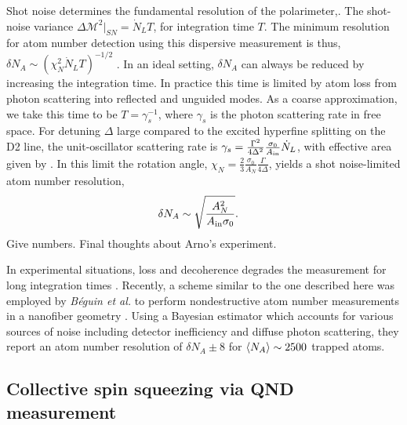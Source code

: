 \documentclass[preprint,aps,pra,onecolumn]{revtex4-1} %
\newcommand{\shotnoise}{\Delta \mathcal{M}^2_{\rm SN}}
\newcommand{\projnoise}{\Delta \mathcal{M}^2_{\rm PN}}
\newcommand{\comment}[1]{{\color{Maroon} #1}}
\begin{document}
Shot noise determines the fundamental resolution of the polarimeter,.  The shot-noise variance $\Delta \mathcal{M}^2|_{SN} =  \dot{N}_L T$, for integration time $T$.  The minimum resolution for atom number detection using this dispersive measurement is thus, $\delta N_A \sim ( \chi_N^2 \dot{N}_L T)^{-1/2}$ \cite{smith_faraday_2003}.  In an ideal setting, $\delta N_A$ can always be reduced by increasing the integration time. In practice this time is limited by atom loss from photon scattering into reflected and unguided modes. As a coarse approximation, we take this time to be $T=\gamma_s^{-1}$, where $\gamma_s$ is the photon scattering rate in free space.  For detuning $\Delta$ large compared to the excited hyperfine splitting on the D2 line, the unit-oscillator scattering rate is $\gamma_s = \frac{\Gamma^2}{4 \Delta^2}\frac{\sigma_0 }{A_{\rm in}} \dot{N}_L $, with effective area given by .  In this limit the rotation angle, $\chi_N = \frac{2}{3} \frac{\sigma_0}{A_N}\frac{\Gamma}{4\Delta}$, yields a shot noise-limited atom number resolution, 
	\begin{align} \label{Eq::AtomNumberResolution}
		\delta N_A  &\sim \sqrt {\frac{A_N^2}{A_{\rm in} \sigma_0}}.
	\end{align}
\comment{Give numbers. Final thoughts about Arno's experiment.} 

In experimental situations, loss and decoherence degrades the measurement for long integration times \cite{dawkins_dispersive_2011, zhang_collective_2012}. Recently, a scheme similar to the one described here was employed by \emph{B\'{e}guin et al.} to perform nondestructive atom number measurements in a nanofiber geometry \cite{beguin_generation_2014}.  Using a Bayesian estimator which accounts for various sources of noise including detector inefficiency and diffuse photon scattering, they report an atom number resolution of $\delta N_A \pm 8$ for $\langle{N_A}\rangle\sim2500$ trapped atoms.  




	\subsection{Collective spin squeezing via QND measurement}
\end{document}

